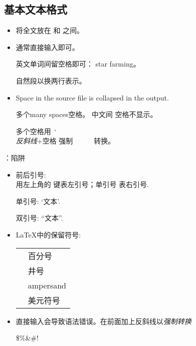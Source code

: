 \documentclass{beamer}
\begin{document}
\subsection{基本文本格式}
\begin{frame}[fragile]{\insertsubsection{}}
\small
\begin{itemize}
\item 将全文放在  和 之间。
\item 通常直接输入即可。
\begin{exampletwouptiny}
英文单词间留空格即可：
star farming。

自然段以换两行表示。
\end{exampletwouptiny}
\item Space in the source file is collapsed in the output.
\begin{exampletwouptiny}
多个many      spaces空格。
中文间         空格不显示。

多个空格用
\emph{\char`\\ 反斜线}$+$空格
强制\ \ \ \ \ \ 转换。
\end{exampletwouptiny}
\end{itemize}
\end{frame}

\begin{frame}[fragile]{\insertsubsection{}：陷阱}
\small
\begin{itemize}
\item 前后引号:\\
用左上角的 \keystroke{\`{}} 键表左引号；单引号\keystroke{\'{}} 表右引号.
\begin{exampletwouptiny}
单引号: `文本'.

双引号: ``文本''.
\end{exampletwouptiny}

\item \LaTeX 中的保留符号:\\[1ex]
\begin{tabular}{cl}
\keystrokebftt{\%} & 百分号              \\
\keystrokebftt{\#} & 井号     \\
\keystrokebftt{\&} & ampersand                 \\
\keystrokebftt{\$} & 美元符号               \\
\end{tabular}
\item 直接输入会导致语法错误。在前面加上反斜线以\emph{强制转换}
\begin{exampletwoup}
\$\%\&\#!
\end{exampletwoup}
\end{itemize}
\end{frame}
\end{document}
